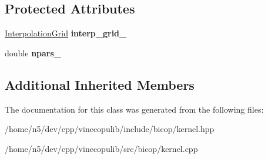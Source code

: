 \subsection*{Protected Attributes}
\begin{DoxyCompactItemize}
\item 
\hyperlink{classvinecopulib_1_1_interpolation_grid}{Interpolation\+Grid} {\bfseries interp\+\_\+grid\+\_\+}\hypertarget{classvinecopulib_1_1_kernel_bicop_aa8cfe1dd0786d692562252de05c46588}{}\label{classvinecopulib_1_1_kernel_bicop_aa8cfe1dd0786d692562252de05c46588}

\item 
double {\bfseries npars\+\_\+}\hypertarget{classvinecopulib_1_1_kernel_bicop_a1b49a0a2630e71079c08ebdca79b06b6}{}\label{classvinecopulib_1_1_kernel_bicop_a1b49a0a2630e71079c08ebdca79b06b6}

\end{DoxyCompactItemize}
\subsection*{Additional Inherited Members}


The documentation for this class was generated from the following files\+:\begin{DoxyCompactItemize}
\item 
/home/n5/dev/cpp/vinecopulib/include/bicop/kernel.\+hpp\item 
/home/n5/dev/cpp/vinecopulib/src/bicop/kernel.\+cpp\end{DoxyCompactItemize}
